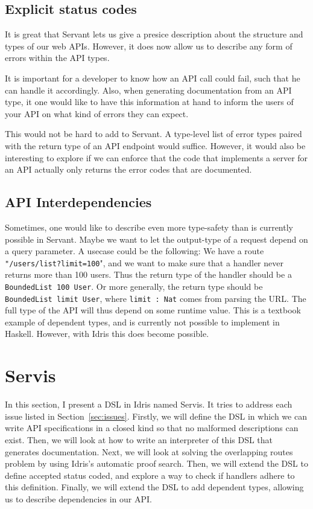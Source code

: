 \documentclass[12pt,a4paper]{article}
\begin{document}
\subsection{Explicit status codes}
It is great that Servant lets us give a presice description about the structure and types of our web APIs. However, it does now allow us to describe any form of errors within the API types.

It is important for a developer to know how an API call could fail, such that he can handle it accordingly. Also, when generating documentation from an API type, it one would like to have this information at hand to inform the users of your API on what kind of errors they can expect.

This would not be hard to add to Servant. A type-level list of error types paired with the return type of an API endpoint would suffice. However, it would also be interesting to explore if we can enforce that the code that implements a server for an API actually only returns the error codes that are documented.

\subsection{API Interdependencies}
\label{sec:inter}
Sometimes, one would like to describe even more type-safety than is currently possible in Servant. Maybe we want to let the output-type of a request depend on a query parameter.
A usecase could be the following: We have a route \texttt{"/users/list?limit=100}", and we want to make sure that a handler never returns more than 100 users.  Thus the return type of the handler should be a \texttt{BoundedList 100 User}. Or more generally, the return type should be \texttt{BoundedList limit User}, where \texttt{limit : Nat} comes from parsing the URL.  The full type of the API will thus depend on some runtime value. This is a textbook example of dependent types, and is currently not possible to implement in Haskell.
However, with Idris this does become possible.

\section{Servis}
In this section, I present a DSL in Idris named Servis.
It tries to address each issue listed in Section~\ref{sec:issues}.
Firstly, we will define the DSL in which we can write API specifications in a closed kind so that no malformed
descriptions can exist. Then, we will look at how to write an interpreter of this DSL that generates documentation.
Next, we will look at solving the overlapping routes problem by using Idris's automatic proof search.
Then, we will  extend the DSL to define accepted status coded, and explore a way to check if handlers adhere to this definition.
Finally, we will extend the DSL to add dependent types, allowing us to describe dependencies in our API\@.
\end{document}
